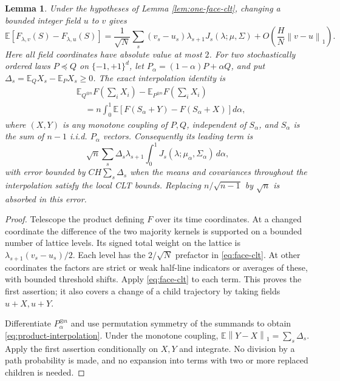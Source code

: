 \documentclass[11pt]{article}
\newtheorem{lemma}[theorem]{Lemma}
\theoremstyle{remark}\newtheorem{remark}[theorem]{Remark}
\newcommand{\E}{\mathbb E}
\newcommand{\norm}[1]{\left\lVert #1\right\rVert}
\begin{document}
\begin{lemma}\label{lem:kernel-calculus}
Under the hypotheses of Lemma \ref{lem:one-face-clt}, changing a bounded
integer field $u$ to $v$ gives
\[
 \E[F_{\lambda,v}(S)-F_{\lambda,u}(S)]
 =\frac1{\sqrt N}\sum_s(v_s-u_s)\lambda_{s+1}
          J_s(\lambda;\mu,\Sigma)
  +O\!\left(\frac HN\norm{v-u}_1\right).
\]
Here all field coordinates have absolute value at most $2$.
For two stochastically ordered laws $P\preceq Q$ on $\{-1,+1\}^d$,
let $P_\alpha=(1-\alpha)P+\alpha Q$, and put
$\Delta_s=\E_QX_s-\E_PX_s\ge0$.
The exact interpolation identity is
\begin{align}
 &\E_{Q^{\otimes n}}F\left(\sum_iX_i\right)
       -\E_{P^{\otimes n}}F\left(\sum_iX_i\right)\nonumber\\
 &\quad=n\int_0^1
    \E\left[F(S_\alpha+Y)-F(S_\alpha+X)\right]d\alpha,
 \label{eq:product-interpolation}
\end{align}
where $(X,Y)$ is any monotone coupling of $P,Q$, independent of
$S_\alpha$, and $S_\alpha$ is the sum of $n-1$ i.i.d. $P_\alpha$ vectors.
Consequently its leading term is
\[
 \sqrt n\sum_s\Delta_s\lambda_{s+1}
        \int_0^1J_s(\lambda;\mu_\alpha,\Sigma_\alpha)\,d\alpha,
\]
with error bounded by $C H\sum_s\Delta_s$ when the means and covariances
throughout the interpolation satisfy the local CLT bounds.
Replacing $n/\sqrt{n-1}$ by $\sqrt n$ is absorbed in this error.
\end{lemma}
\begin{proof}
Telescope the product defining $F$ over its time coordinates.
At a changed coordinate the difference of the two majority kernels is
supported on a bounded number of lattice levels. Its signed total weight
on the lattice is $\lambda_{s+1}(v_s-u_s)/2$. Each level has the $2/\sqrt N$ prefactor in
\eqref{eq:face-clt}. At other coordinates the factors are strict or weak
half-line indicators or averages of these, with bounded threshold shifts.
Apply \eqref{eq:face-clt} to each term. This proves the first assertion;
it also covers a change of a child trajectory by taking fields $u+X,u+Y$.

Differentiate $P_\alpha^{\otimes n}$ and use permutation symmetry of the
summands to obtain \eqref{eq:product-interpolation}. Under the monotone
coupling, $\E\norm{Y-X}_1=\sum_s\Delta_s$.
Apply the first assertion conditionally on $X,Y$ and integrate.
No division by a path probability is made, and no expansion into terms
with two or more replaced children is needed.
\end{proof}
\end{document}
